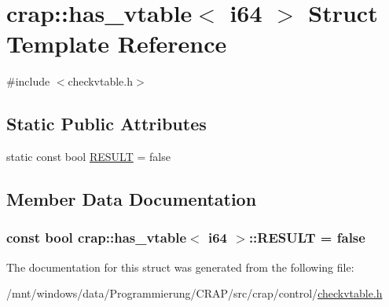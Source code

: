 \hypertarget{structcrap_1_1has__vtable_3_01i64_01_4}{\section{crap\-:\-:has\-\_\-vtable$<$ i64 $>$ Struct Template Reference}
\label{structcrap_1_1has__vtable_3_01i64_01_4}
}


{\ttfamily \#include $<$checkvtable.\-h$>$}

\subsection*{Static Public Attributes}
\begin{DoxyCompactItemize}
\item 
static const bool \hyperlink{structcrap_1_1has__vtable_3_01i64_01_4_afd19afa10a496b172943d1324fcdf08b}{R\-E\-S\-U\-L\-T} = false
\end{DoxyCompactItemize}


\subsection{Member Data Documentation}
\hypertarget{structcrap_1_1has__vtable_3_01i64_01_4_afd19afa10a496b172943d1324fcdf08b}{
\subsubsection[{R\-E\-S\-U\-L\-T}]{\setlength{\rightskip}{0pt plus 5cm}const bool {\bf crap\-::has\-\_\-vtable}$<$ {\bf i64} $>$\-::R\-E\-S\-U\-L\-T = false\hspace{0.3cm}{\ttfamily [static]}}}\label{structcrap_1_1has__vtable_3_01i64_01_4_afd19afa10a496b172943d1324fcdf08b}


The documentation for this struct was generated from the following file\-:\begin{DoxyCompactItemize}
\item 
/mnt/windows/data/\-Programmierung/\-C\-R\-A\-P/src/crap/control/\hyperlink{checkvtable_8h}{checkvtable.\-h}\end{DoxyCompactItemize}

